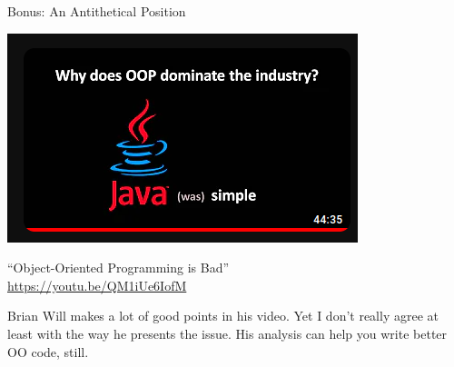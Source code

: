 \begin{frame}{Bonus: An Antithetical Position}
%
\begin{center}
	\includegraphics[width=.4\linewidth]{./gfx/01-OOP-bad}
	
	\enquote{Object-Oriented Programming is Bad}\\
	\url{https://youtu.be/QM1iUe6IofM}
\end{center}
%
\begin{hintbox}
\small
Brian Will makes a lot of good points in his video. Yet I don't really agree at least with the way he presents the issue. His analysis can help you write better OO code, still.
\end{hintbox}
%
\end{frame}

